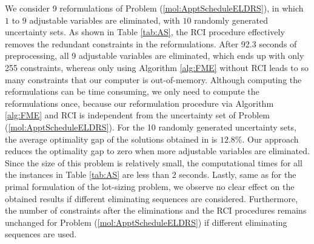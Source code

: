 \documentclass[fleqn,mnsc,blindrev]{informs4}
\begin{document}
We consider 9 reformulations of Problem (\ref{mol:ApptScheduleELDRS}), in which $1$ to $9$ adjustable variables are eliminated, with $10$ randomly generated uncertainty sets.  As shown in Table \ref{tab:AS}, the RCI procedure effectively removes the redundant constraints in the reformulations. After 92.3 seconds of preprocessing, all 9 adjustable variables are eliminated, which ends up with only 255 constraints, whereas only using Algorithm \ref{alg:FME} without RCI leads to so many constraints that our computer is out-of-memory. Although computing the reformulations can be time consuming, we only need to compute the reformulations once, because our reformulation procedure via Algorithm \ref{alg:FME} and RCI is independent from the uncertainty set of Problem (\ref{mol:ApptScheduleELDRS}). For the 10 randomly generated uncertainty sets, the average optimality gap of the solutions obtained in \cite{bsz17} is $12.8\%$. Our approach reduces the optimality gap to zero when more adjustable variables are eliminated. Since the size of this problem is relatively small, the computational times for all the instances in Table \ref{tab:AS} are less than 2 seconds.  {Lastly, same as for the primal formulation of the lot-sizing problem, we observe no clear effect on the obtained results if different eliminating sequences are considered. Furthermore, the number of constraints after the eliminations and the RCI procedures remains unchanged for Problem (\ref{mol:ApptScheduleELDRS}) if different eliminating sequences are used.}
\end{document}
